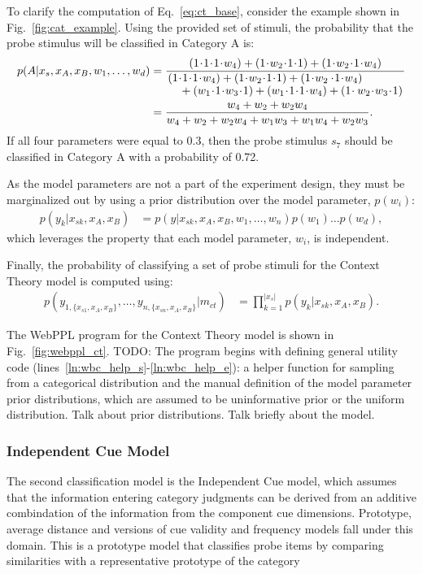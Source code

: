 \documentclass[11pt]{article}
\begin{document}
To clarify the computation of Eq.~\ref{eq:ct_base}, consider the example shown in Fig.~\ref{fig:cat_example}. Using the provided set of stimuli, the probability that the probe stimulus will be classified in Category A is: 
\begin{align}
    p(A | x_s, x_A, x_B, w_1, \dots, w_d) 
        &= \frac{(1\!\cdot\!1\!\cdot\!1\!\cdot\!w_4) + (1\!\cdot\!w_2\!\cdot\!1\!\cdot\!1) + (1\!\cdot\!w_2\!\cdot\!1\!\cdot\!w_4)}{ \splitfrac{(1\!\cdot\!1\!\cdot\!1\!\cdot\!w_4) + (1\!\cdot\!w_2\!\cdot\!1\!\cdot\!1) + (1\!\cdot\!w_2 \cdot\!1\!\cdot\!w_4)}{+ (w_1\!\cdot\!1\!\cdot\!w_3\!\cdot\!1) + (w_1\!\cdot\!1\!\cdot\!1\!\cdot\!w_4) + (1\!\cdot w_2\!\cdot\!w_3\!\cdot\!1)}} \notag \\
        &= \frac{w_4 + w_2 + w_2w_4}{w_4 + w_2 + w_2w_4 + w_1w_3 + w_1w_4 + w_2w_3}. 
\end{align}
If all four parameters were equal to 0.3, then the probe stimulus $s_7$ should be classified in Category A with a probability of 0.72. 

As the model parameters are not a part of the experiment design, they must be marginalized out by using a prior distribution over the model parameter, $p(w_i)$:
\begin{align}
    p(y_k | x_{sk}, x_A, x_B) &=  p(y|x_{sk}, x_A, x_B ,w_1, \dots, w_n) p(w_1) \dots p(w_d),
\end{align}
which leverages the property that each model parameter, $w_i$, is independent.

Finally, the probability of classifying a set of probe stimuli for the Context Theory model is computed using: 
\begin{align}
    p(y_{1,\{x_{s1}, x_A, x_B\}}, \dots, y_{n,\{x_{sn}, x_A, x_B\}} | m_{ct}) &=  \prod\limits_{k=1}^{|x_s|} p(y_k|x_{sk}, x_A, x_B).
\end{align}

The WebPPL program for the Context Theory model is shown in Fig.~\ref{fig:webppl_ct}. TODO: The program begins with defining general utility code (lines~\ref{ln:wbc_help_s}-\ref{ln:wbc_help_e}): a helper function for sampling from a categorical distribution and the manual definition of the model parameter prior distributions, which are assumed to be uninformative prior or the uniform distribution. Talk about prior distributions. Talk briefly about the model. 


\subsubsection{Independent Cue Model}
The second classification model is the Independent Cue model, which assumes that the information entering category judgments can be derived from an additive combindation of the information from the component cue dimensions. Prototype, average distance and versions of cue validity and frequency models fall under this domain. This is a prototype model that classifies probe items by comparing similarities with a representative prototype of the category
\end{document}
